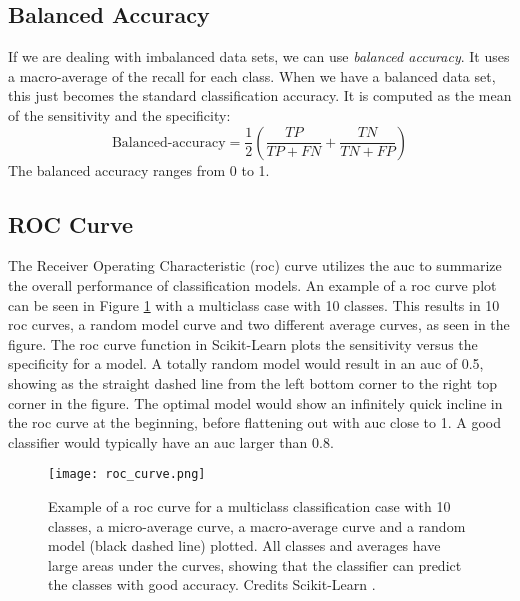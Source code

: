 \documentclass[a4paper, american, 12pt]{report}
\begin{document}
	
	\subsection{Balanced Accuracy}
	\label{subsect:Theory-BalancedAcc}
	If we are dealing with imbalanced data sets, we can use \textit{balanced accuracy}. It uses a macro-average of the recall for each class. When we have a balanced data set, this just becomes the standard classification accuracy. It is computed as the mean of the sensitivity and the specificity:
	\begin{equation}
	\label{eq:BalancedAcc}
		\text{Balanced-accuracy}=\frac{1}{2}\left(\frac{TP}{TP+FN}+\frac{TN}{TN+FP}\right)
	\end{equation}
	The balanced accuracy ranges from 0 to 1.
		
	
	\subsection{ROC Curve}
	\label{subsect:Theory-ROC}
	The Receiver Operating Characteristic (\acrshort{roc}) curve utilizes the \acrshort{auc} to summarize the overall performance of classification models. An example of a \acrshort{roc} curve plot can be seen in Figure \ref{fig:ROC} with a multiclass case with 10 classes. This results in 10 \acrshort{roc} curves, a random model curve and two different average curves, as seen in the figure. The \acrshort{roc} curve function in Scikit-Learn plots the sensitivity versus the specificity for a model. A totally random model would result in an \acrshort{auc} of 0.5, showing as the straight dashed line from the left bottom corner to the right top corner in the figure. The optimal model would show an infinitely quick incline in the \acrshort{roc} curve at the beginning, before flattening out with \acrshort{auc} close to 1. A good classifier would typically have an \acrshort{auc} larger than 0.8.
	\begin{figure}[htb!]
		\hspace*{-1.0cm}
		\centering\texttt{[image: roc\_curve.png]}
		\caption[ROC Curve.]{Example of a \acrshort{roc} curve for a multiclass classification case with 10 classes, a micro-average curve, a macro-average curve and a random model (black dashed line) plotted. All classes and averages have large areas under the curves, showing that the classifier can predict the classes with good accuracy. Credits Scikit-Learn \cite{scikit-learn}. \label{fig:ROC}}
	\end{figure}
	
\end{document}

